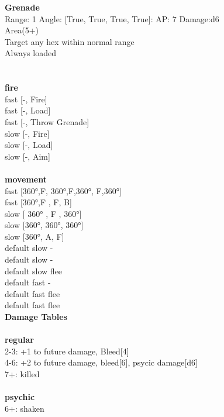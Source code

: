 {\bf Grenade } \\



Range: 1  Angle: [True, True, True, True]: AP: 7 Damage:d6 \\
Area(5+)\\ 
Target any hex within normal range\\ 
Always loaded\\ 




 
\ \\



\ \\ {\bf fire } \\
fast [-, Fire] \\
fast [-, Load] \\
fast [-, Throw Grenade] \\
slow [-, Fire] \\
slow [-, Load] \\
slow [-, Aim] \\
\ \\ {\bf movement } \\
fast [360°,F, 360°,F,360°, F,360°] \\
fast [360°,F , F, B] \\
slow [ 360° ,  F ,  360°] \\
slow [360°, 360°, 360°] \\
slow [360°, A, F] \\
default slow - \\
default slow - \\
default slow flee \\
default fast - \\
default fast flee \\
default fast flee \\


{\bf Damage Tables} \\
\ \\ {\bf regular } \\
2-3: +1 to future damage, Bleed[4] \\
4-6: +2 to future damage, bleed[6], psycic damage[d6] \\
7+: killed \\
\ \\ {\bf psychic } \\
6+: shaken \\










